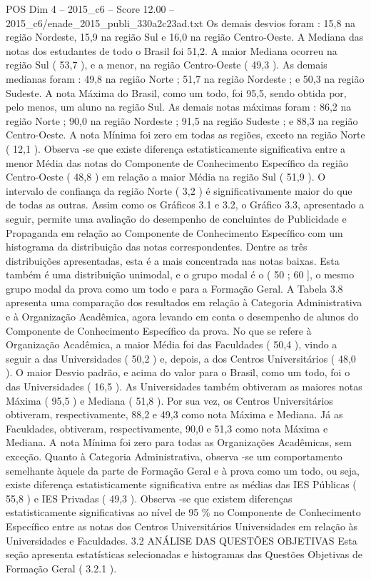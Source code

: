 \begin{textsample}{POS Dim 4 – 2015\_c6 – Score 12.00 – 2015\_c6/enade\_2015\_publi\_330a2c23ad.txt}
Os demais desvios foram : 15,8 na região Nordeste, 15,9 na região Sul e 16,0 na região Centro-Oeste.
A Mediana das notas dos estudantes de todo o Brasil foi 51,2.
A maior Mediana ocorreu na região Sul ( 53,7 ), e a menor, na região Centro-Oeste ( 49,3 ).
As demais medianas foram : 49,8 na região Norte ; 51,7 na região Nordeste ; e 50,3 na região Sudeste.
A nota Máxima do Brasil, como um todo, foi 95,5, sendo obtida por, pelo menos, um aluno na região Sul.
As demais notas máximas foram : 86,2 na região Norte ; 90,0 na região Nordeste ; 91,5 na região Sudeste ; e 88,3 na região Centro-Oeste.
A nota Mínima foi zero em todas as regiões, exceto na região Norte ( 12,1 ).
Observa -se que existe diferença estatisticamente significativa entre a menor Média das notas do Componente de Conhecimento Específico da região Centro-Oeste ( 48,8 ) em relação a maior Média na região Sul ( 51,9 ).
O intervalo de confiança da região Norte ( 3,2 ) é significativamente maior do que de todas as outras.
Assim como os Gráficos 3.1 e 3.2, o Gráfico 3.3, apresentado a seguir, permite uma avaliação do desempenho de concluintes de Publicidade e Propaganda em relação ao Componente de Conhecimento Específico com um histograma da distribuição das notas correspondentes.
Dentre as três distribuições apresentadas, esta é a mais concentrada nas notas baixas.
Esta também é uma distribuição unimodal, e o grupo modal é o ( 50 ; 60 ], o mesmo grupo modal da prova como um todo e para a Formação Geral.
A Tabela 3.8 apresenta uma comparação dos resultados em relação à Categoria Administrativa e à Organização Acadêmica, agora levando em conta o desempenho de alunos do Componente de Conhecimento Específico da prova.
No que se refere à Organização Acadêmica, a maior Média foi das Faculdades ( 50,4 ), vindo a seguir a das Universidades ( 50,2 ) e, depois, a dos Centros Universitários ( 48,0 ).
O maior Desvio padrão, e acima do valor para o Brasil, como um todo, foi o das Universidades ( 16,5 ).
As Universidades também obtiveram as maiores notas Máxima ( 95,5 ) e Mediana ( 51,8 ).
Por sua vez, os Centros Universitários obtiveram, respectivamente, 88,2 e 49,3 como nota Máxima e Mediana.
Já as Faculdades, obtiveram, respectivamente, 90,0 e 51,3 como nota Máxima e Mediana.
A nota Mínima foi zero para todas as Organizações Acadêmicas, sem exceção.
Quanto à Categoria Administrativa, observa -se um comportamento semelhante àquele da parte de Formação Geral e à prova como um todo, ou seja, existe diferença estatisticamente significativa entre as médias das IES Públicas ( 55,8 ) e IES Privadas ( 49,3 ).
Observa -se que existem diferenças estatisticamente significativas ao nível de 95 \% no Componente de Conhecimento Específico entre as notas dos Centros Universitários Universidades em relação às Universidades e Faculdades. 3.2 ANÁLISE DAS QUESTÕES OBJETIVAS Esta seção apresenta estatísticas selecionadas e histogramas das Questões Objetivas de Formação Geral ( 3.2.1 ).

\end{textsample}

